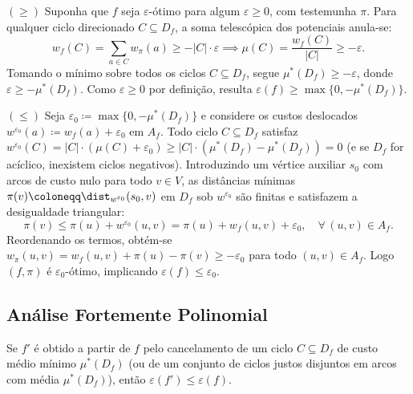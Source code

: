 \begin{demonstracao}
$(\ge)$ Suponha que $f$ seja $\varepsilon$-ótimo para algum $\varepsilon \ge 0$, com testemunha $\pi$. Para qualquer ciclo direcionado $C \subseteq D_f$, a soma telescópica dos potenciais anula-se:
\begin{equation*}
    w_f(C) = \sum_{a \in C} w_\pi(a) \ge -|C| \cdot \varepsilon \implies \mu(C) = \frac{w_f(C)}{|C|} \ge -\varepsilon.
\end{equation*}
Tomando o mínimo sobre todos os ciclos $C \subseteq D_f$, segue $\mu^*(D_f) \ge -\varepsilon$, donde $\varepsilon \ge -\mu^*(D_f)$. Como $\varepsilon \ge 0$ por definição, resulta $\varepsilon(f) \ge \max\{0, -\mu^*(D_f)\}$.

\medskip
\noindent $(\le)$ Seja $\varepsilon_0 \coloneqq \max\{0, -\mu^*(D_f)\}$ e considere os custos deslocados $w^{\varepsilon_0}(a) \coloneqq w_f(a) + \varepsilon_0$ em $A_f$. Todo ciclo $C \subseteq D_f$ satisfaz $w^{\varepsilon_0}(C) = |C|\cdot(\mu(C) + \varepsilon_0) \ge |C|\cdot(\mu^*(D_f) - \mu^*(D_f)) = 0$ (e se $D_f$ for acíclico, inexistem ciclos negativos). Introduzindo um vértice auxiliar $s_0$ com arcos de custo nulo para todo $v \in V$, as distâncias mínimas $\pi(v) \coloneqq \dist_{w^{\varepsilon_0}}(s_0, v)$ em $D_f$ sob $w^{\varepsilon_0}$ são finitas e satisfazem a desigualdade triangular:
\begin{equation*}
    \pi(v) \le \pi(u) + w^{\varepsilon_0}(u,v) = \pi(u) + w_f(u,v) + \varepsilon_0, \quad \forall\, (u,v) \in A_f.
\end{equation*}
Reordenando os termos, obtém-se $w_\pi(u,v) = w_f(u,v) + \pi(u) - \pi(v) \ge -\varepsilon_0$ para todo $(u,v) \in A_f$. Logo $(f, \pi)$ é $\varepsilon_0$-ótimo, implicando $\varepsilon(f) \le \varepsilon_0$.
\end{demonstracao}


\subsection{Análise Fortemente Polinomial}

\begin{prop}\label{prop:mmcc_monotonicidade}
Se $f'$ é obtido a partir de $f$ pelo cancelamento de um ciclo $C \subseteq D_f$ de custo médio mínimo $\mu^*(D_f)$ (ou de um conjunto de ciclos justos disjuntos em arcos com média $\mu^*(D_f)$), então $\varepsilon(f') \le \varepsilon(f)$.
\end{prop}

